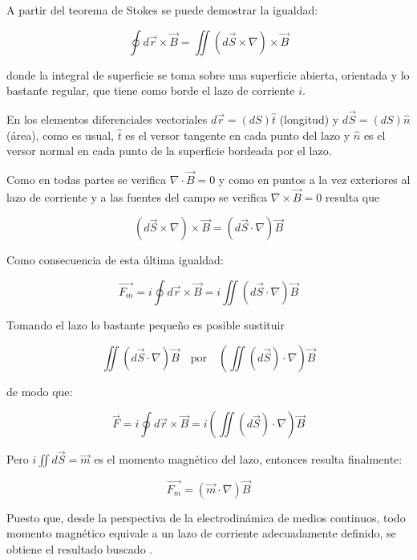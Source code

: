 A partir del teorema de Stokes se puede demostrar la igualdad: 

\begin{equation*}
\oint d\overrightarrow{r}\times\overrightarrow{B}=\iint (d\overrightarrow{S}\times \nabla)\times\overrightarrow{B}
\end{equation*}

donde la integral de superficie se toma sobre una superficie abierta, orientada y lo bastante regular, que tiene como borde el lazo de corriente $i$. 

En los elementos diferenciales vectoriales $d\overrightarrow{r}=(dS)\hat{t}$ (longitud) y $d\overrightarrow{S}=(dS)\hat{n}$ (área), como es usual, $\hat{t}$ es el versor tangente en cada punto del lazo y $\hat{n}$ es el versor normal en cada punto de la superficie bordeada por el lazo. 

Como en todas partes se verifica $\nabla\cdot\overrightarrow{B}=0$ y como en puntos a la vez exteriores al lazo de corriente y a las fuentes del campo se verifica $\nabla \times \overrightarrow{B} = 0$ resulta que 

\begin{equation*}
(d\overrightarrow{S} \times \nabla ) \times \overrightarrow{B} = (d\overrightarrow{S} \cdot \nabla ) \overrightarrow{B}
\end{equation*} 

Como consecuencia de esta última igualdad: 

\begin{equation*}
\overrightarrow{F_{m}}=i\oint d\overrightarrow{r}\times\overrightarrow{B} = i \iint (d\overrightarrow{S} \cdot \nabla)\overrightarrow{B}
\end{equation*}

Tomando el lazo lo bastante pequeño es posible sustituir 

\begin{equation*}
\iint (d\overrightarrow{S} \cdot \nabla)\overrightarrow{B}\quad \text{por}\quad \left( \iint (d\overrightarrow{S}) \cdot \nabla\right) \overrightarrow{B}
\end{equation*}

de modo que: 

\begin{equation*}
\overrightarrow{F}=i\oint d\overrightarrow{r} \times \overrightarrow{B} = i \left( \iint (d\overrightarrow{S}) \cdot \nabla\right) \overrightarrow{B} 
\end{equation*}


Pero $i\iint d\overrightarrow{S} = \overrightarrow{m}$ es el momento magnético del lazo, entonces resulta finalmente: 

\begin{equation*}
\overrightarrow{F_{m}}=(\overrightarrow{m}\cdot\nabla)\overrightarrow{B} 
\end{equation*}

Puesto que, desde la perspectiva de la electrodinámica de medios continuos, todo momento magnético equivale a un lazo de corriente adecuadamente definido, se obtiene el resultado buscado \citep{Kompaneyets}\citep{Landau8}.